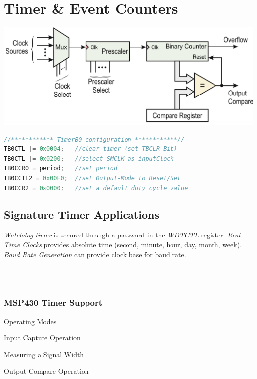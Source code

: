\section{Timer \& Event Counters }
\includegraphics[width=\columnwidth]{"Images/TimerFuntionsweise.png"}
\begin{lstlisting}[language=C]
//************ TimerB0 configuration ************//
TB0CTL |= 0x0004;   //clear timer (set TBCLR Bit)
TB0CTL |= 0x0200;   //select SMCLK as inputClock
TB0CCR0 = period;   //set period
TB0CCTL2 = 0x00E0;  //set Output-Mode to Reset/Set
TB0CCR2 = 0x0000;   //set a default duty cycle value
\end{lstlisting}\vspace{-20px}



\subsection{Signature Timer Applications }
\textit{Watchdog timer} is secured through a password in the \textit{WDTCTL} register.
\textit{Real-Time Clocks} provides absolute time (second, minute, hour, day, month, week).
\textit{Baud Rate Generation} can provide clock base for baud rate.

\begin{minipage}{.5\columnwidth}
\end{minipage}
\begin{minipage}{.5\columnwidth}
	\\
	\\
\end{minipage}

\subsubsection{MSP430 Timer Support }

Operating Modes

Input Capture Operation

Measuring a Signal Width

Output Compare Operation

